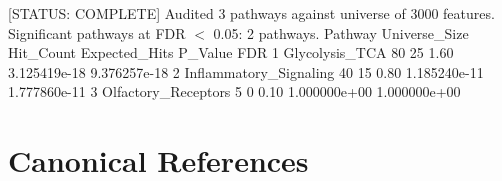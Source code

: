 \documentclass[11pt,twoside,openright]{book}
\begin{document}
\begin{routput}
{}[STATUS: COMPLETE] Audited 3 pathways against universe of 3000 features.
Significant pathways at FDR $<$ 0.05: 2 pathways.
                 Pathway Universe\_Size Hit\_Count Expected\_Hits      P\_Value          FDR
1         Glycolysis\_TCA            80        25          1.60 3.125419e-18 9.376257e-18
2 Inflammatory\_Signaling            40        15          0.80 1.185240e-11 1.777860e-11
3    Olfactory\_Receptors             5         0          0.10 1.000000e+00 1.000000e+00
\end{routput}

\section*{Canonical References}
\end{document}
